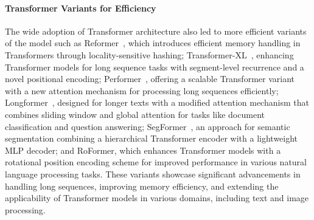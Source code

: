 \documentclass{article}
\begin{document}
\paragraph{Transformer Variants for Efficiency}
The wide adoption of Transformer architecture also led to more efficient variants of the model such as Reformer~\cite{kitaev2019reformer},
which introduces efficient memory handling in Transformers through locality-sensitive hashing; Transformer-XL~\cite{dai2019transformer},
enhancing Transformer models for long sequence tasks with segment-level recurrence and a novel positional encoding;
Performer~\cite{choromanski2020rethinking}, offering a scalable Transformer variant with a new attention mechanism for processing long sequences efficiently;
Longformer~\cite{beltagy2020longformer}, designed for longer texts with a modified attention mechanism that combines sliding window and global attention for tasks like document classification and question answering;
SegFormer~\cite{xie2021segformer}, an approach for semantic segmentation combining a hierarchical Transformer encoder with a lightweight MLP decoder; and
RoFormer\cite{su2023roformer}, which enhances Transformer models with a rotational position encoding scheme for improved performance in various natural language processing tasks.
These variants showcase significant advancements in handling long sequences,
improving memory efficiency, and extending the applicability of Transformer models in various domains, including text and image processing.


\end{document}
